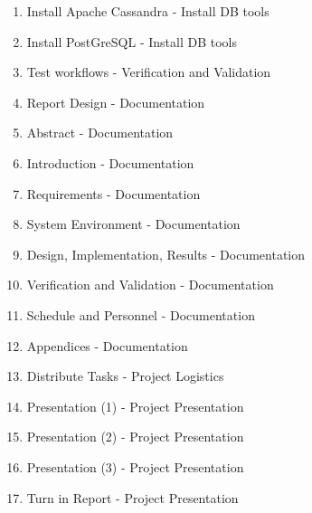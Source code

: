 \begin{enumerate}
  \item Install Apache Cassandra - Install DB tools
  \item Install PostGreSQL - Install DB tools

  \item Test workflows - Verification and Validation

  \item Report Design - Documentation
  \item Abstract - Documentation
  \item Introduction - Documentation
  \item Requirements - Documentation
  \item System Environment - Documentation
  \item Design, Implementation, Results - Documentation
  \item Verification and Validation - Documentation
  \item Schedule and Personnel - Documentation
  \item Appendices - Documentation

  \item Distribute Tasks - Project Logistics
  \item Presentation (1) - Project Presentation
  \item Presentation (2) - Project Presentation
  \item Presentation (3) - Project Presentation
  \item Turn in Report - Project Presentation
\end{enumerate}
